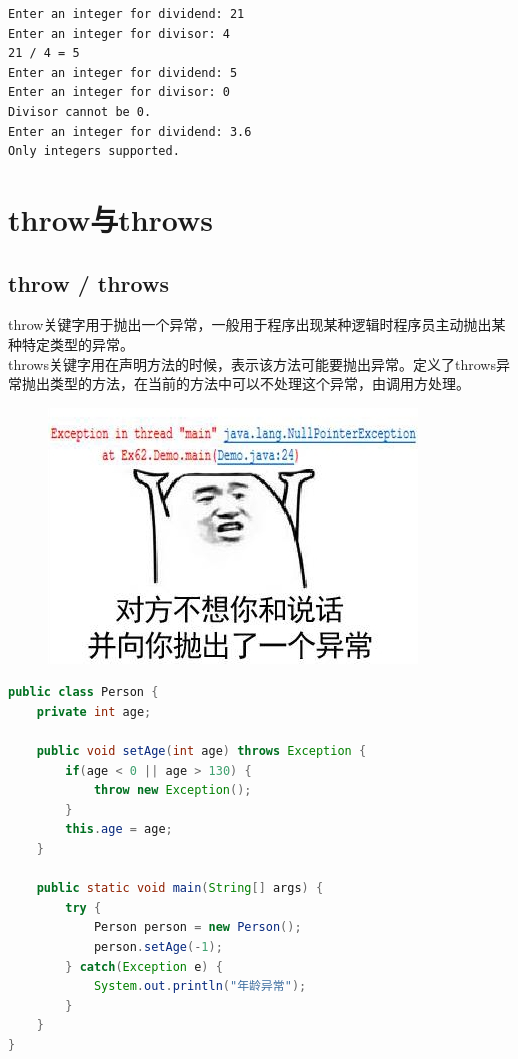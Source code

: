 \begin{tcolorbox}
    \begin{verbatim}
Enter an integer for dividend: 21
Enter an integer for divisor: 4
21 / 4 = 5
Enter an integer for dividend: 5
Enter an integer for divisor: 0
Divisor cannot be 0.
Enter an integer for dividend: 3.6
Only integers supported.
	\end{verbatim}
\end{tcolorbox}

\newpage

\section{throw与throws}

\subsection{throw / throws}

throw关键字用于抛出一个异常，一般用于程序出现某种逻辑时程序员主动抛出某种特定类型的异常。\\

throws关键字用在声明方法的时候，表示该方法可能要抛出异常。定义了throws异常抛出类型的方法，在当前的方法中可以不处理这个异常，由调用方处理。\\

\begin{figure}[H]
    \centering
    \includegraphics{img/Chapter7/7-2/1.png}
\end{figure}


\begin{lstlisting}[language=Java]
public class Person {
    private int age;
    
    public void setAge(int age) throws Exception {
        if(age < 0 || age > 130) {
            throw new Exception();
        }
        this.age = age; 
    }
    
    public static void main(String[] args) {
        try {
            Person person = new Person();
            person.setAge(-1);
        } catch(Exception e) {
            System.out.println("年龄异常");
        }
    }
}
\end{lstlisting}

